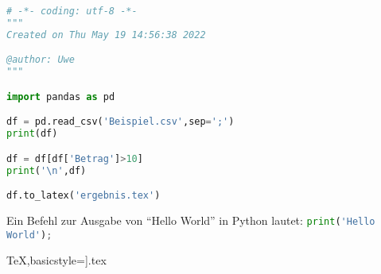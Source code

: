 \documentclass[12pt,ngerman,parskip=half]{scrartcl}
\begin{document}
\begin{lstlisting}[language=Python,morekeywords={read_csv}]
# -*- coding: utf-8 -*-
"""
Created on Thu May 19 14:56:38 2022

@author: Uwe
"""

import pandas as pd

df = pd.read_csv('Beispiel.csv',sep=';')
print(df)

df = df[df['Betrag']>10]
print('\n',df)

df.to_latex('ergebnis.tex')
\end{lstlisting}

Ein Befehl zur Ausgabe von \enquote{Hello World} in Python
 lautet: \lstinline[language=Python]{print('Hello World');}



{TeX},basicstyle=\tiny]{\jobname.tex}
\end{document}

